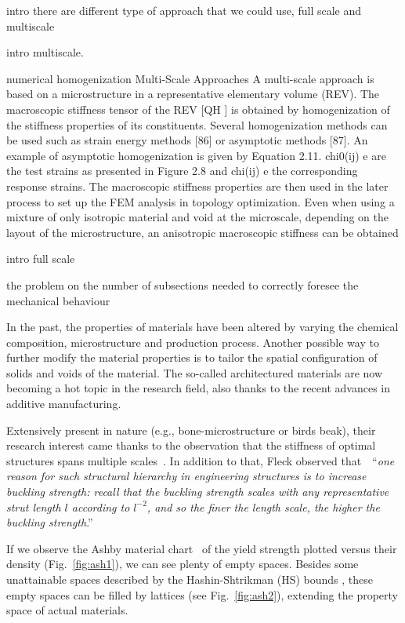 intro there are different type of approach that we could use, full scale and multiscale

intro multiscale.

numerical homogenization
Multi-Scale Approaches
A multi-scale approach is based on a microstructure in a representative elementary volume (REV). The
macroscopic stiffness tensor of the REV [QH ] is obtained by homogenization of the stiffness properties of its
constituents. Several homogenization methods can be used such as strain energy methods [86] or asymptotic
methods [87]. An example of asymptotic homogenization is given by Equation 2.11. chi0(ij)
e are the test strains
as presented in Figure 2.8 and chi(ij)
e the corresponding response strains. The macroscopic stiffness properties
are then used in the later process to set up the FEM analysis in topology optimization. Even when using a
mixture of only isotropic material and void at the microscale, depending on the layout of the microstructure,
an anisotropic macroscopic stiffness can be obtained

intro full scale

the problem on the number of subsections needed to correctly foresee the mechanical behaviour

In the past, the properties of materials have been altered by varying the chemical composition, microstructure and production process. Another possible way to further modify the material properties is to tailor the spatial configuration of solids and voids of the material. The so-called architectured materials are now becoming a hot topic in the research field, also thanks to the recent advances in additive manufacturing.

Extensively present in nature (e.g., bone-microstructure or birds beak), their research interest came thanks to the observation that the stiffness of optimal structures spans multiple scales~. In addition to that, Fleck observed that~~``\textit{one reason for such structural hierarchy in engineering structures is to increase buckling strength: recall that the buckling strength scales with any representative strut length $l$ according to $l^{-2}$, and so the finer the length scale, the higher the buckling strength}.''

If we observe the Ashby material chart~ of the yield strength plotted versus their density (Fig.~\ref{fig:ash1}), we can see plenty of empty spaces. Besides some unattainable spaces described by the Hashin-Shtrikman (HS) bounds , these empty spaces can be filled by lattices (see Fig.~\ref{fig:ash2}), extending the property space of actual materials.

